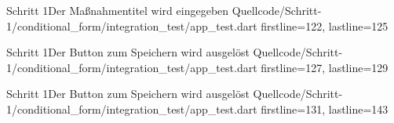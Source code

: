 \begin{alexlisting}{Schritt 1}{Der Maßnahmentitel wird eingegeben}
  {Quellcode/Schritt-1/conditional_form/integration_test/app_test.dart}
  {firstline=122, lastline=125}
  \label{lst:Schritt1MaßnahmentitelWirdEingegeben}
\end{alexlisting}



\begin{alexlisting}{Schritt 1}{Der Button zum Speichern wird ausgelöst}
  {Quellcode/Schritt-1/conditional_form/integration_test/app_test.dart}
  {firstline=127, lastline=129}
  \label{lst:Schritt1ButtonZumSpeichernWirdAusgelöst}
\end{alexlisting}

\begin{alexlisting}{Schritt 1}{Der Button zum Speichern wird ausgelöst}
  {Quellcode/Schritt-1/conditional_form/integration_test/app_test.dart}
  {firstline=131, lastline=143}
  \label{lst:Schritt1ErgebnisWirdVerglichen}
\end{alexlisting}


